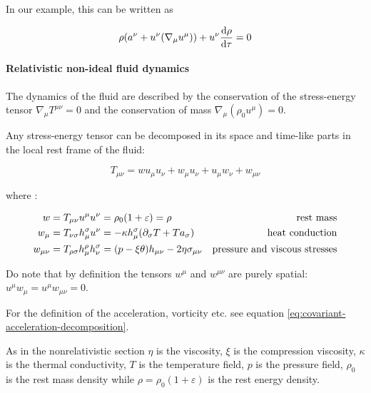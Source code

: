 \documentclass[main.tex]{subfiles}
\begin{document}
In our example, this can be written as

\begin{equation}
  \rho (a^\nu + u^\nu (\nabla_\mu u^\mu)) + u^\nu \dv{\rho}{\tau} = 0
\end{equation}


\paragraph{Relativistic non-ideal fluid dynamics}

The dynamics of the fluid are described by the conservation of the stress-energy tensor \(\nabla_\mu T ^{\mu \nu} =0\) and the conservation of mass \(\nabla_\mu (\rho_0 u^\mu) =0\).

Any stress-energy tensor can be decomposed in its space and time-like parts in the local rest frame of the fluid:

\begin{equation} \label{eq:stress-energy-tensor-decomposition}
    T_{\mu \nu} = w u_\mu u_\nu + w_\mu u_\nu + u_\mu w_\nu + w _{\mu \nu}
\end{equation}

where \cite[eqs. 8.2, 8.3, 8.5]{Taub:1948}:

\begin{subequations} \label{eq:components-stress-energy-tensor}
\begin{align}
  w &=  T _{\mu \nu} u^\mu u^\nu = \rho_0 (1 + \varepsilon) = \rho & \text{rest mass} \\
  w_\mu &= T _{\nu \sigma} h^\sigma _\mu u^\nu  = -\kappa h_\mu ^\sigma  \qty(\partial_\sigma T + T a_\sigma) & \text{heat conduction} \\
  w_{\mu \nu} &= T_{\rho \sigma} h^\rho _\mu h^\sigma_\nu = \qty(p - \xi \theta) h_{\mu \nu} - 2 \eta \sigma_{\mu \nu}  & \text{pressure and viscous stresses}
\end{align}
\end{subequations}

Do note that by definition the tensors \(w^\mu\) and \(w^{\mu\nu}\) are purely spatial: \(u^\mu w_\mu = u^\mu w_{\mu \nu} = 0\).

For the definition of the acceleration, vorticity etc. see equation \eqref{eq:covariant-acceleration-decomposition}.

As in the nonrelativistic section \(\eta\) is the viscosity, \(\xi\) is the compression viscosity,  \(\kappa\) is the thermal conductivity, \(T\) is the temperature field, \(p\) is the pressure field, \(\rho_0\) is the rest mass density while \(\rho = \rho_0 (1 + \varepsilon)\) is the rest energy density.
\end{document}
